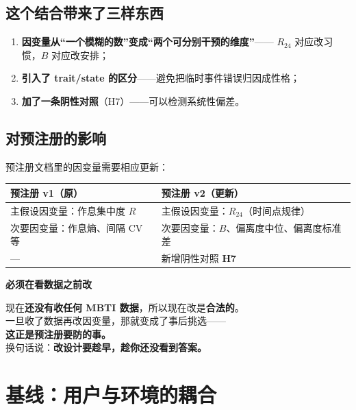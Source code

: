 \documentclass[UTF8,a4paper,11pt]{ctexart}
\newenvironment{explainbox}[1]
{\begin{center}\begin{minipage}{0.94\textwidth}\colorbox{boxbg}{\parbox{0.92\textwidth}{\textbf{#1}\par\vspace{2pt}}}}
{\end{minipage}\end{center}}
\begin{document}
\subsection{这个结合带来了三样东西}

\begin{enumerate}[leftmargin=1.8em]
\item \textbf{因变量从“一个模糊的数”变成“两个可分别干预的维度”}——
      $R_{24}$ 对应改习惯，$B$ 对应改安排；
\item \textbf{引入了 trait/state 的区分}——避免把临时事件错误归因成性格；
\item \textbf{加了一条阴性对照}（H7）——可以检测系统性偏差。
\end{enumerate}

\subsection{对预注册的影响}

预注册文档里的因变量需要相应更新：

\begin{center}
\begin{tabular}{p{5.4cm}p{7.0cm}}
\toprule
\textbf{预注册 v1（原）} & \textbf{预注册 v2（更新）} \\
\midrule
主假设因变量：作息集中度 $R$ & 主假设因变量：\textbf{$R_{24}$}（时间点规律） \\
次要因变量：作息熵、间隔 CV 等 & 次要因变量：\textbf{$B$}、偏离度中位、偏离度标准差 \\
— & 新增阴性对照 \textbf{H7} \\
\bottomrule
\end{tabular}
\end{center}

\begin{explainbox}{必须在看数据之前改}
现在\textbf{还没有收任何 MBTI 数据}，所以现在改是\textbf{合法的}。\\
一旦收了数据再改因变量，那就变成了事后挑选——\\
\textbf{这正是预注册要防的事。}\\[4pt]
换句话说：\textbf{改设计要趁早，趁你还没看到答案。}
\end{explainbox}

\newpage


\section{基线：用户与环境的耦合}
\end{document}

